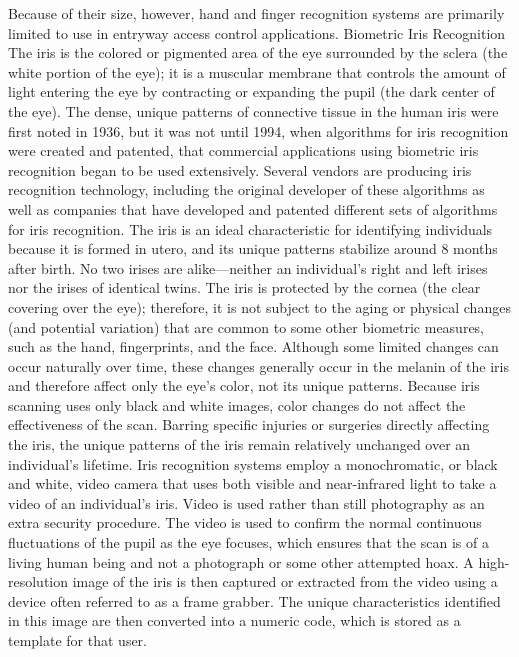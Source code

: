 \documentclass{article}
\begin{document}
Because of their size, however, hand and finger recognition systems are
primarily limited to use in entryway access control applications.
Biometric Iris Recognition The iris is the colored or pigmented area of
the eye surrounded by the sclera (the white portion of the eye); it is a
muscular membrane that controls the amount of light entering the eye by
contracting or expanding the pupil (the dark center of the eye). The
dense, unique patterns of connective tissue in the human iris were first
noted in 1936, but it was not until 1994, when algorithms for iris
recognition were created and patented, that commercial applications
using biometric iris recognition began to be used extensively. Several
vendors are producing iris recognition technology, including the
original developer of these algorithms as well as companies that have
developed and patented different sets of algorithms for iris
recognition. The iris is an ideal characteristic for identifying
individuals because it is formed in utero, and its unique patterns
stabilize around 8 months after birth. No two irises are alike---neither
an individual's right and left irises nor the irises of identical twins.
The iris is protected by the cornea (the clear covering over the eye);
therefore, it is not subject to the aging or physical changes (and
potential variation) that are common to some other biometric measures,
such as the hand, fingerprints, and the face. Although some limited
changes can occur naturally over time, these changes generally occur in
the melanin of the iris and therefore affect only the eye's color, not
its unique patterns. Because iris scanning uses only black and white
images, color changes do not affect the effectiveness of the scan.
Barring specific injuries or surgeries directly affecting the iris, the
unique patterns of the iris remain relatively unchanged over an
individual's lifetime. Iris recognition systems employ a monochromatic,
or black and white, video camera that uses both visible and
near-infrared light to take a video of an individual's iris. Video is
used rather than still photography as an extra security procedure. The
video is used to confirm the normal continuous fluctuations of the pupil
as the eye focuses, which ensures that the scan is of a living human
being and not a photograph or some other attempted hoax. A
high-resolution image of the iris is then captured or extracted from the
video using a device often referred to as a frame grabber. The unique
characteristics identified in this image are then converted into a
numeric code, which is stored as a template for that user.
\end{document}
